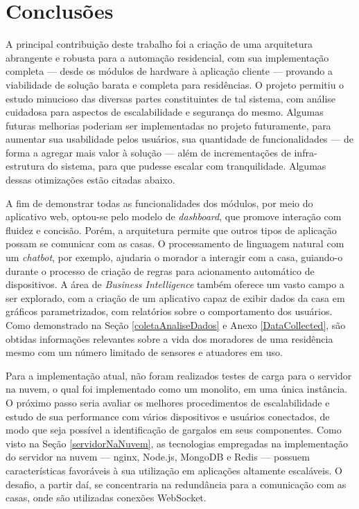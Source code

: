 \chapter{Conclusões}

A principal contribuição deste trabalho foi a criação de uma arquitetura abrangente e robusta para a automação residencial, com sua implementação completa --- desde os módulos de hardware à aplicação cliente --- provando a viabilidade de solução barata e completa para residências. O projeto permitiu o estudo minucioso das diversas partes constituintes de tal sistema, com análise cuidadosa para aspectos de escalabilidade e segurança do mesmo. Algumas futuras melhorias poderiam ser implementadas no projeto futuramente, para aumentar sua usabilidade pelos usuários, sua quantidade de funcionalidades --- de forma a agregar mais valor à solução --- além de incrementações de infra-estrutura do sistema, para que pudesse escalar com tranquilidade. Algumas dessas otimizações estão citadas abaixo.

A fim de demonstrar todas as funcionalidades dos módulos, por meio do aplicativo web, optou-se pelo modelo de \textit{dashboard}, que promove interação com fluidez e concisão. Porém, a arquitetura permite que outros tipos de aplicação possam se comunicar com as casas. O processamento de linguagem natural com um \textit{chatbot}, por exemplo, ajudaria o morador a interagir com a casa, guiando-o durante o processo de criação de regras para acionamento automático de dispositivos. A área de \textit{Business Intelligence} também oferece um vasto campo a ser explorado, com a criação de um aplicativo capaz de exibir dados da casa em gráficos parametrizados, com relatórios sobre o comportamento dos usuários. Como demonstrado na Seção \ref{coletaAnaliseDados} e Anexo \ref{DataCollected}, são obtidas informações relevantes sobre a vida dos moradores de uma residência mesmo com um número limitado de sensores e atuadores em uso.

Para a implementação atual, não foram realizados testes de carga para o servidor na nuvem, o qual foi implementado como um monolito, em uma única instância. O próximo passo seria avaliar os melhores procedimentos de escalabilidade e estudo de sua performance com vários dispositivos e usuários conectados, de modo que seja possível a identificação de gargalos em seus componentes. Como visto na Seção \ref{servidorNaNuvem}, as tecnologias empregadas na implementação do servidor na nuvem --- nginx, Node.js, MongoDB e Redis --- possuem características favoráveis à sua utilização em aplicações altamente escaláveis.  O desafio, a partir daí, se concentraria na redundância para a comunicação com as casas, onde são utilizadas conexões WebSocket.

